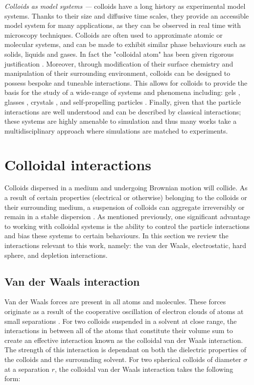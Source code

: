 \textit{Colloids as model systems ---} colloids have a long history as experimental model systems. Thanks to their size and diffusive time scales, they provide an accessible model system for many applications, as they can be observed in real time with microscopy techniques.
Colloids are often used to approximate atomic or molecular systems, and can be made to exhibit similar phase behaviours such as solids, liquids and gases. In fact the "colloidal atom" has been given rigorous justification \cite{mcmillan1945}.
Moreover, through modification of their surface chemistry and manipulation of their surrounding environment, colloids can be designed to possess bespoke and tuneable interactions. This allows for colloids to provide the basis for the study of a wide-range of systems and phenomena including: gels \cite{zaccarelli2007}, glasses \cite{poon2004}, crystals \cite{yethiraj2003}, and self-propelling particles \cite{bechinger2016a}. 
Finally, given that the particle interactions are well understood and can be described by classical interactions; these systems are highly amenable to simulation and thus many works take a multidisciplinary approach where simulations are matched to experiments.


\section{Colloidal interactions}
\label{section:colloidalInteractions}

Colloids dispersed in a medium and undergoing Brownian motion will collide. As a result of certain properties (electrical or otherwise) belonging to the colloids or their surrounding medium, a suspension of colloids can aggregate irreversibly or remain in a stable dispersion \cite{lekkerkerker2011}. As mentioned previously, one significant advantage to working with colloidal systems is the ability to control the particle interactions and bias these systems to certain behaviours. In this section we review the interactions relevant to this work, namely: the van der Waals, electrostatic, hard sphere, and depletion interactions.


\subsection{Van der Waals interaction}

Van der Waals forces are present in all atoms and molecules. These forces originate as a result of the cooperative oscillation of electron clouds of atoms at small separations \cite{lekkerkerker2011}. For two colloids suspended in a solvent at close range, the interactions in between all of the atoms that constitute their volume sum to create an effective interaction known as the colloidal van der Waals interaction. The strength of this interaction is dependant on both the dielectric properties of the colloids and the surrounding solvent. For two spherical colloids of diameter $\sigma$ at a separation $r$, the colloidal van der Waals interaction takes the following form:

